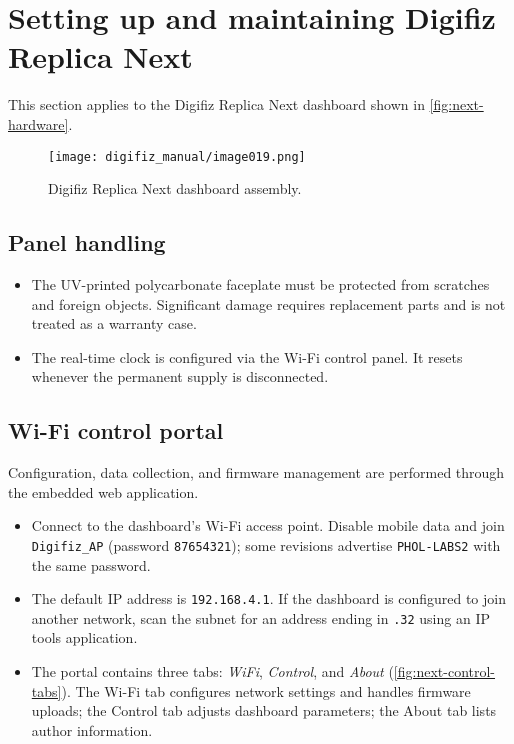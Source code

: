 \chapter{Setting up and maintaining Digifiz Replica Next}\label{ch:replica-next-setup}

This section applies to the Digifiz Replica Next dashboard shown in \autoref{fig:next-hardware}.

\begin{figure}[htbp]
    \centering
    \texttt{[image: digifiz\_manual/image019.png]}
    \caption{Digifiz Replica Next dashboard assembly.}
    \label{fig:next-hardware}
\end{figure}

\section{Panel handling}
\begin{itemize}
    \item The UV-printed polycarbonate faceplate must be protected from scratches and foreign objects. Significant damage requires replacement parts and is not treated as a warranty case.
    \item The real-time clock is configured via the Wi-Fi control panel. It resets whenever the permanent supply is disconnected.
\end{itemize}

\section{Wi-Fi control portal}
Configuration, data collection, and firmware management are performed through the embedded web application.
\begin{itemize}
    \item Connect to the dashboard's Wi-Fi access point. Disable mobile data and join \texttt{Digifiz\_AP} (password \texttt{87654321}); some revisions advertise \texttt{PHOL-LABS2} with the same password.
    \item The default IP address is \texttt{192.168.4.1}. If the dashboard is configured to join another network, scan the subnet for an address ending in \texttt{.32} using an IP tools application.
    \item The portal contains three tabs: \emph{WiFi}, \emph{Control}, and \emph{About} (\autoref{fig:next-control-tabs}). The Wi-Fi tab configures network settings and handles firmware uploads; the Control tab adjusts dashboard parameters; the About tab lists author information.
\end{itemize}

